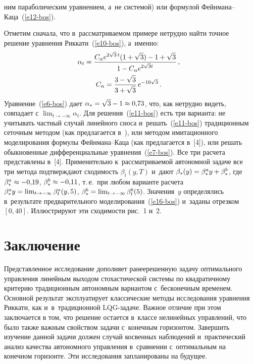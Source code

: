 \begin{multicols}{2}
\pagebreak

\noindent
ним 
параболическим уравнением, а~не сис\-те\-мой) или формулой  
Фейн\-ма\-на--Ка\-ца~(\ref{e12-bos}).

     
     Отметим сначала, что в~рас\-смат\-ри\-ва\-емом примере не\-труд\-но найти 
точное решение уравнения Риккати~(\ref{e10-bos}), а~именно: 
    \begin{multline*}
     \alpha_t= \displaystyle\frac{\displaystyle C_\alpha e^{2\sqrt{3}\,t} (1+\sqrt{3})-1+\sqrt{3}\mathstrut}{\displaystyle 1-
C_\alpha e^{2\sqrt{3}t}\mathstrut}\,,\\
     C_\alpha =\displaystyle\frac{\displaystyle 3-\sqrt{3}\mathstrut}{\displaystyle 3+\sqrt{3}\mathstrut}\,e^{-10\sqrt{3}}\,.
    \end{multline*}
     Уравнение~(\ref{e6-bos}) дает $\alpha_*\hm= \sqrt{3}\hm-1\hm\approx 
0{,}73$, что, как нетрудно видеть, совпадает с $\lim_{t\to -\infty} \alpha_t$. 
Для решения~(\ref{e11-bos}) есть три варианта: не учитывать част\-ный случай 
линейного сноса и~решать~(\ref{e11-bos}) традиционным сеточным методом 
(как предлагается в~\cite{5-bos}), или методом имитационного 
моделирования формулы Фейн\-ма\-на--Ка\-ца (как предлагается в~[4]), или 
решать обыкновенные дифференциальные уравнения~(\ref{e7-bos}). Все три 
расчета пред\-став\-ле\-ны в~[4]. Применительно к~рас\-смат\-ри\-ва\-емой автономной 
задаче все три метода под\-тверж\-да\-ют схо\-ди\-мость $\beta_t(y,T)$ и~дают 
$\beta_*(y)\hm= \beta_*^a y\hm+ \beta_*^b$, где $\beta_*^a\hm\approx -
0{,}19$, $\beta_*^b\hm\approx -0{,}11$, т.\,е.\ при любом варианте расчета 
$\beta_*^a y\hm= \lim_{t\to-\infty} \beta_t^a(y,5)$, $\beta_*^b\hm= \lim_{t\to-
\infty} \beta_t^b(5)$. Значения~$y$ определялись в~результате 
предварительного моделирования~(\ref{e16-bos}) и~заданы отрезком $[0,40]$. 
Иллюстрируют эти сходимости рис.~1 и~2.
     
  
\section{Заключение}

     Представленное исследование дополняет ранее\linebreak решенную задачу 
оптимального управления линейным выходом стохастической сис\-те\-мы по 
квад\-ра\-тич\-но\-му критерию традиционным автономным вариантом 
с~бесконечным временем. Основной \mbox{результат} эксплуатирует классические 
методы исследования уравнения Риккати, как и~в~традиционной 
 LQG-за\-да\-че. Важное отличие при этом заключается в том, что решение 
остается в~классе нелинейных управ\-ле\-ний, что было также важным\linebreak 
свойством задачи с~конечным горизонтом. Завершить изучение данной 
задачи должен случай \mbox{косвенных} наблюдений и~практический анализ 
качества автономного управ\-ле\-ния в~сравнении с~оптимальным на 
конечном горизонте. Эти исследования запланированы на будущее.
     

\end{multicols}
